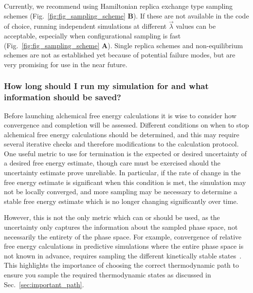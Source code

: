 \documentclass[9pt,bestpractices,pubversion]{livecoms}
\begin{document}
Currently, we recommend using Hamiltonian replica exchange type sampling schemes (Fig.~\ref{fig:fig_sampling_scheme} \textbf{B}). If these are not available in the code of choice, running independent simulations at different $\vec{\lambda}$ values can be acceptable, especially when configurational sampling is fast (Fig.~\ref{fig:fig_sampling_scheme} \textbf{A}). Single replica schemes and non-equilibrium schemes are not as established yet because of potential failure modes, but are very promising for use in the near future. 


\subsubsection{How long should I run my simulation for and what information should be saved?}
\label{sec:sim_length_information_kept}
Before launching alchemical free energy calculations it is wise to consider how convergence and completion will be assessed. Different conditions on when to stop alchemical free energy calculations should be determined, and this may require several iterative checks and therefore modifications to the calculation protocol.
One useful metric to use for termination is the expected or desired uncertainty of a desired free energy estimate, though care must be exercised should the uncertainty estimate prove unreliable.
In particular, if the rate of change in the free energy estimate is significant when this condition is met, the simulation may not be locally converged, and more sampling may be necessary to determine a stable free energy estimate which is no longer changing significantly over time. 


However, this is not the only metric which can or should be used, as the uncertainty only captures the information about the sampled phase space, not necessarily the entirety of the phase space.  
For example, convergence of relative free energy calculations in predictive simulations where the entire phase space is not known in advance, requires sampling the different kinetically stable states~\cite{mobley2012perspective}. 
This highlights the importance of choosing the correct thermodynamic path to ensure you sample the required thermodynamic states as discussed in Sec.~\ref{sec:important_path}.
\end{document}
